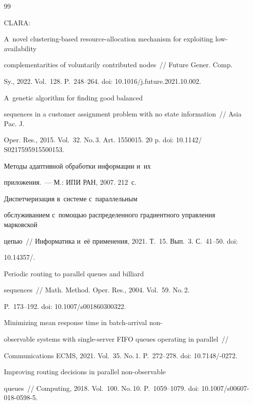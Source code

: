{{\begin{thebibliography}{99}


 CLARA: 


A~novel clustering-based resource-allocation mechanism for exploiting low-availability 


complementarities of voluntarily contributed nodes~/\!\!/ Future Gener. Comp. 


Sy., 2022. Vol.~128. P.~248--264. doi: 10.1016\!/\!j.future.2021.10.002.




 A~genetic algorithm for finding good balanced 


sequences in a customer assignment problem with no state information~/\!\!/ Asia Pac. J. 


Oper. Res., 2015. Vol.~32. No.\,3. Art. 1550015. 20 p. doi: 10.1142\!/ S0217595915500153.




 Методы адаптивной обработки информации и~их  


приложения.~--- М.: ИПИ РАН, 2007. 212~с.




 Диспетчеризация в~системе с~параллельным 


обслуживанием с~помощью распределенного градиентного управления марковской 


цепью~/\!\!/ Информатика и~её применения, 2021. Т.~15. Вып.~3. С.~41--50. doi: 


10.14357\!/.




 Periodic routing to parallel queues and billiard 


sequences~/\!\!/ Math. Method. Oper. Res., 2004. Vol.~59. No.\,2.  


P.~173--192. doi: 10.1007\!/\!s001860300322.




 Minimizing mean response time in batch-arrival non-


observable systems with single-server FIFO queues operating in parallel~/\!\!/ 


Communications ECMS, 2021. Vol.~35. No.\,1. P.~272--278. doi: 10.7148\!/-0272.




 Improving routing decisions in parallel non-observable 


queues~/\!\!/ Computing, 2018. Vol.~100. No.\,10. P.~1059--1079. doi: 10.1007\!/\!s00607-018-0598-5.





   \end{thebibliography}


} }











